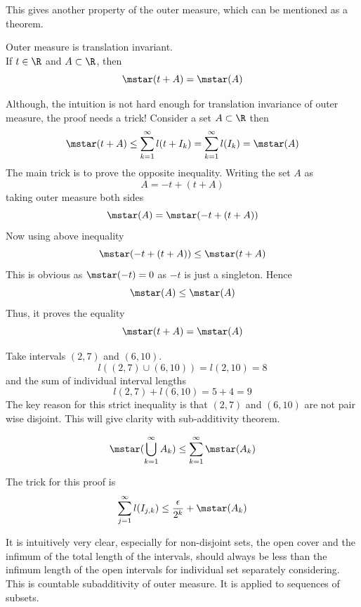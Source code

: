 This gives another property of the outer measure, which can be mentioned as a theorem.
\begin{theorem}
    Outer measure is translation invariant. \\
    If $t\in \R$ and $A \subset \R$, then 
    \[
    \mstar(t + A)=\mstar(A)
    \]
\end{theorem}
\begin{proofsketch}
    Although, the intuition is not hard enough for translation invariance of outer measure, the proof needs a trick! Consider a set $A \subset \R$ then
    \[
    \mstar(t+A) \leq \sum_{k=1}^\infty l(t+I_k)
    =\sum_{k=1}^\infty l(I_k)=\mstar(A)
    \]
    The main trick is to prove the opposite inequality. Writing the set $A$ as
    \[
    A = -t +(t+A)
    \]
    taking outer measure both sides
    \[
    \mstar(A) = \mstar(-t + (t+A))
    \]
    Now using above inequality
    \[
    \mstar(-t +(t+A)) \leq \mstar(t+A)
    \]
    This is obvious as $\mstar(-t) =0$ as $-t$ is just a singleton. Hence
    \[
    \mstar(A) \leq \mstar(A)
    \]
    Thus, it proves the equality
    \[
    \mstar(t+A) = \mstar(A)
    \]
\end{proofsketch}
\begin{example}
    Take intervals $(2, 7)$ and $(6, 10)$. 
    \[
    l((2, 7) \cup (6, 10)) = l(2, 10)=8
    \]
    and the sum of individual interval lengths
    \[
    l(2, 7) + l(6, 10) = 5+4=9
    \]
    The key reason for this strict inequality is that $(2, 7)$ and $(6, 10)$ are not pair wise disjoint. This will give clarity with sub-additivity theorem. 
\end{example}
\begin{theorem}
    \[
    \mstar(\bigcup_{k=1}^\infty A_k) \leq \sum_{k=1}^\infty \mstar(A_k)
    \]
\end{theorem}
\begin{proofsketch}
    The trick for this proof is
    \[
    \sum_{j=1}^\infty l(I_{j,k})\leq \frac{\epsilon}{2^k} + \mstar(A_k)
    \]
    
\end{proofsketch}
\begin{concept}
    It is intuitively very clear, especially for non-disjoint sets, the open cover and the infimum of the total length of the intervals, should always be less than the infimum length of the open intervals for individual set separately considering. This is countable subadditivity of outer measure. It is applied to sequences of subsets.  
\end{concept}